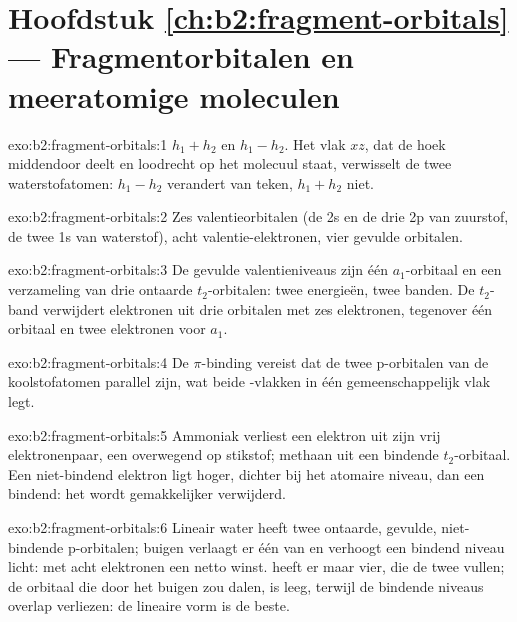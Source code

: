 \section*{Hoofdstuk \ref{ch:b2:fragment-orbitals} --- Fragmentorbitalen en meeratomige moleculen}

\begin{solution}{exo:b2:fragment-orbitals:1}
$h_1 + h_2$ en $h_1 - h_2$. Het vlak $xz$, dat de hoek middendoor deelt en
loodrecht op het molecuul staat, verwisselt de twee waterstofatomen: $h_1 - h_2$ verandert
van teken, $h_1 + h_2$ niet.
\end{solution}

\begin{solution}{exo:b2:fragment-orbitals:2}
Zes valentieorbitalen (de 2s en de drie 2p van zuurstof, de twee 1s van waterstof), acht valentie-elektronen,
vier gevulde orbitalen.
\end{solution}

\begin{solution}{exo:b2:fragment-orbitals:3}
De gevulde valentieniveaus zijn één $a_1$-orbitaal en een verzameling van drie ontaarde
$t_2$-orbitalen: twee energieën, twee banden. De $t_2$-band verwijdert elektronen uit drie
orbitalen met zes elektronen, tegenover één orbitaal en twee elektronen voor $a_1$.
\end{solution}

\begin{solution}{exo:b2:fragment-orbitals:4}
De $\pi$-binding vereist dat de twee p-orbitalen van de koolstofatomen parallel zijn, wat
beide -vlakken in één gemeenschappelijk vlak legt.
\end{solution}

\begin{solution}{exo:b2:fragment-orbitals:5}
Ammoniak verliest een elektron uit zijn vrij elektronenpaar, een overwegend  op
stikstof; methaan uit een bindende $t_2$-orbitaal. Een niet-bindend elektron ligt hoger,
dichter bij het atomaire niveau, dan een bindend: het wordt gemakkelijker verwijderd.
\end{solution}

\begin{solution}{exo:b2:fragment-orbitals:6}
Lineair water heeft twee ontaarde, gevulde, niet-bindende p-orbitalen; buigen verlaagt er één
van en verhoogt een bindend niveau licht: met acht elektronen een netto winst. 
heeft er maar vier, die de twee  vullen; de orbitaal die door het buigen
zou dalen, is leeg, terwijl de bindende niveaus overlap verliezen: de lineaire vorm is de beste.
\end{solution}

